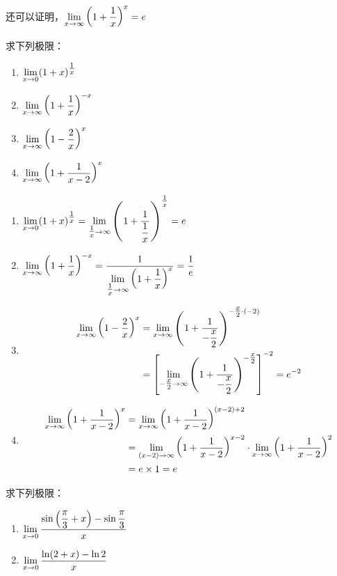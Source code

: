 还可以证明，$\lim\limits_{x\to \infty}\left(1+\dfrac{1}{x}\right)^x=e$

\begin{example}
求下列极限： 
\begin{multicols}{2}
\begin{enumerate}[(1)]
    \item $\lim\limits_{x\to 0}(1+x)^{\tfrac{1}{x}}$
    \item $\lim\limits_{x\to \infty}\left(1+\dfrac{1}{x}\right)^{-x}$
    \item $\lim\limits_{x\to \infty}\left(1-\dfrac{2}{x}\right)^x$
    \item $\lim\limits_{x\to \infty}\left(1+\dfrac{1}{x-2}\right)^x$
\end{enumerate}
\end{multicols}
\end{example}

\begin{solution}
\begin{enumerate}[(1)]
    \item $\lim\limits_{x\to 0}(1+x)^{\tfrac{1}{x}}=\lim\limits_{\tfrac{1}{x}\to \infty}\left(1+\dfrac{1}{\dfrac{1}{x}}\right)^{\tfrac{1}{x}}=e$
    \item $\lim\limits_{x\to \infty}\left(1+\dfrac{1}{x}\right)^{-x}=\dfrac{1}{\lim\limits_{\tfrac{1}{x}\to \infty}\left(1+\dfrac{1}{x}\right)^x}=\dfrac{1}{e}$
    \item \[\begin{split}
        \lim\limits_{x\to \infty}\left(1-\dfrac{2}{x}\right)^x&=\lim\limits_{x\to \infty}\left(1+\dfrac{1}{-\dfrac{x}{2}}\right)^{-\tfrac{x}{2}\cdot (-2)}\\
        &=\left[\lim\limits_{-\tfrac{x}{2}\to \infty}\left(1+\dfrac{1}{-\dfrac{x}{2}}\right)^{-\tfrac{x}{2}}\right]^{-2}=e^{-2}
    \end{split}\]
    \item \[\begin{split}
        \lim\limits_{x\to \infty}\left(1+\dfrac{1}{x-2}\right)^x&=\lim\limits_{x\to \infty}\left(1+\dfrac{1}{x-2}\right)^{(x-2)+2}\\
        &=\lim\limits_{(x-2)\to \infty}\left(1+\dfrac{1}{x-2}\right)^{x-2}\cdot \lim\limits_{x\to \infty}\left(1+\dfrac{1}{x-2}\right)^2\\
        &=e\times 1=e
    \end{split}\]
\end{enumerate}
\end{solution}

\begin{example}
求下列极限：
\begin{multicols}{2}
\begin{enumerate}[(1)]
    \item $\lim\limits_{x\to 0}\dfrac{\sin\left(\dfrac{\pi}{3}+x\right)-\sin\dfrac{\pi}{3}}{x} $
    \item $\lim\limits_{x\to 0}\dfrac{\ln(2+x)-\ln 2}{x} $
\end{enumerate}
\end{multicols}
\end{example}

